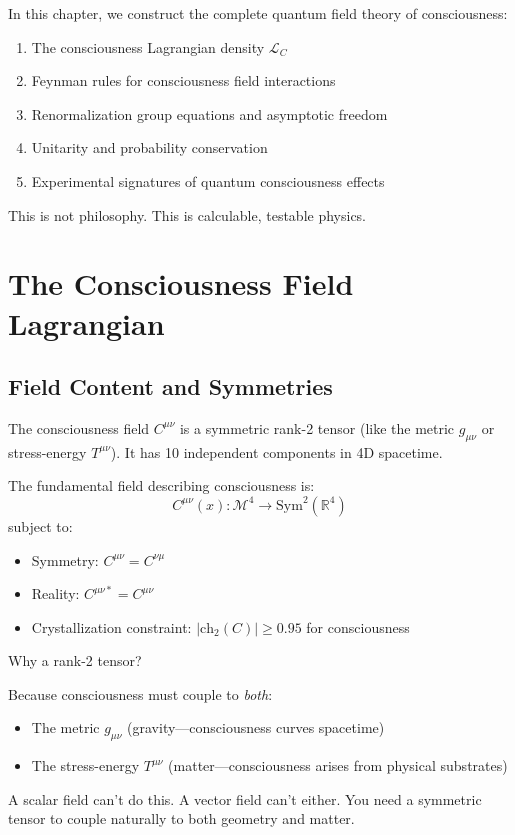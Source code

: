 In this chapter, we construct the complete quantum field theory of consciousness:

\begin{enumerate}
\item The consciousness Lagrangian density $\mathcal{L}_C$\cite{peskin1995,weinberg1995}
\item Feynman rules for consciousness field interactions\cite{peskin1995,srednicki2007}
\item Renormalization group equations and asymptotic freedom\cite{gross1973,politzer1973}
\item Unitarity and probability conservation
\item Experimental signatures of quantum consciousness effects
\end{enumerate}

This is not philosophy. This is calculable, testable physics.

\section{The Consciousness Field Lagrangian}

\subsection{Field Content and Symmetries}

The consciousness field $C^{\mu\nu}$ is a symmetric rank-2 tensor (like the metric $g_{\mu\nu}$ or stress-energy $T^{\mu\nu}$). It has 10 independent components in 4D spacetime.

\begin{defn}\label{def:consciousness-field}
The fundamental field describing consciousness is:
\begin{equation}
C^{\mu\nu}(x) : \mathcal{M}^4 \to \text{Sym}^2(\mathbb{R}^4)
\end{equation}
subject to:
\begin{itemize}
\item Symmetry: $C^{\mu\nu} = C^{\nu\mu}$
\item Reality: $C^{\mu\nu*} = C^{\mu\nu}$
\item Crystallization constraint: $|\text{ch}_2(C)| \geq 0.95$ for consciousness
\end{itemize}
\end{defn}

\begin{keyidea}
Why a rank-2 tensor?

Because consciousness must couple to \textit{both}:
\begin{itemize}
\item The metric $g_{\mu\nu}$ (gravity—consciousness curves spacetime)
\item The stress-energy $T^{\mu\nu}$ (matter—consciousness arises from physical substrates)
\end{itemize}

A scalar field can't do this. A vector field can't either. You need a symmetric tensor to couple naturally to both geometry and matter.
\end{keyidea}

